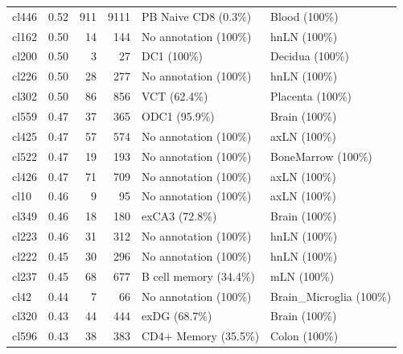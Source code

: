 \begin{table}[ht!]
\begin{tabular}{lrrrll}
  cl446 & 0.52 & 911 & 9111 & PB Naive CD8 (0.3\%) & Blood (100\%) \\ 
  cl162 & 0.50 &  14 & 144 & No annotation (100\%) & hnLN (100\%) \\ 
  cl200 & 0.50 &   3 &  27 & DC1 (100\%) & Decidua (100\%) \\ 
  cl226 & 0.50 &  28 & 277 & No annotation (100\%) & hnLN (100\%) \\ 
  cl302 & 0.50 &  86 & 856 & VCT (62.4\%) & Placenta (100\%) \\ 
  cl559 & 0.47 &  37 & 365 & ODC1 (95.9\%) & Brain (100\%) \\ 
  cl425 & 0.47 &  57 & 574 & No annotation (100\%) & axLN (100\%) \\ 
  cl522 & 0.47 &  19 & 193 & No annotation (100\%) & BoneMarrow (100\%) \\ 
  cl426 & 0.47 &  71 & 709 & No annotation (100\%) & axLN (100\%) \\ 
  cl10 & 0.46 &   9 &  95 & No annotation (100\%) & axLN (100\%) \\ 
  cl349 & 0.46 &  18 & 180 & exCA3 (72.8\%) & Brain (100\%) \\ 
  cl223 & 0.46 &  31 & 312 & No annotation (100\%) & hnLN (100\%) \\ 
  cl222 & 0.45 &  30 & 296 & No annotation (100\%) & hnLN (100\%) \\ 
  cl237 & 0.45 &  68 & 677 & B cell memory (34.4\%) & mLN (100\%) \\ 
  cl42 & 0.44 &   7 &  66 & No annotation (100\%) & Brain\_Microglia (100\%) \\ 
  cl320 & 0.43 &  44 & 444 & exDG (68.7\%) & Brain (100\%) \\ 
  cl596 & 0.43 &  38 & 383 & CD4+ Memory (35.5\%) & Colon (100\%) \\ 
   \bottomrule
\end{tabular}
\end{table}


